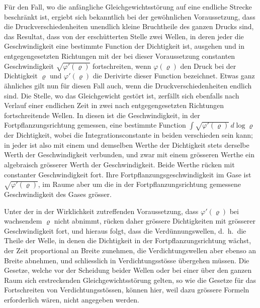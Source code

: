 \documentclass[12pt,a4paper]{article}
\begin{document}
F\"ur den Fall, wo die anf\"angliche Gleichgewichtsst\"orung auf eine endliche Strecke beschr\"ankt ist, ergiebt sich bekanntlich bei der gew\"ohnlichen Voraussetzung, dass die Druckverschiedenheiten unendlich kleine Bruchtheile des ganzen Drucks sind, das Resultat, dass von der ersch\"utterten Stelle zwei Wellen, in deren jeder die Geschwindigkeit eine bestimmte Function der Dichtigkeit ist, ausgehen und in entgegengesetzten Richtungen mit der bei dieser Voraussetzung constanten Geschwindigkeit $\sqrt{\varphi'(\varrho)}$ fortschreiten, wenn $\varphi(\varrho)$ den Druck bei der Dichtigkeit $\varrho$ und $\varphi'(\varrho)$ die Derivirte dieser Function bezeichnet. Etwas ganz \"ahnliches gilt nun f\"ur diesen Fall auch, wenn die Druckverschiedenheiten endlich sind. Die Stelle, wo das Gleichgewicht gest\"ort ist, zerf\"allt sich ebenfalls nach Verlauf einer endlichen Zeit in zwei nach entgegengesetzten Richtungen fortschreitende Wellen. In diesen ist die Geschwindigkeit, in der Fortpflanzungsrichtung gemessen, eine bestimmte Function $\int\sqrt{\varphi'(\varrho)}\,d\log\varrho$ der Dichtigkeit, wobei die Integrationsconstante in beiden verschieden sein kann; in jeder ist also mit einem und demselben Werthe der Dichtigkeit stets derselbe Werth der Geschwindigkeit verbunden, und zwar mit einem gr\"osseren Werthe ein algebraisch gr\"osserer Werth der Geschwindigkeit. Beide Werthe r\"ucken mit constanter Geschwindigkeit fort. Ihre Fortpflanzungsgeschwindigkeit im Gase ist $\sqrt{\varphi'(\varrho)}$, im Raume aber um die in der Fortpflanzungsrichtung gemessene Geschwindigkeit des Gases gr\"osser.

Unter der in der Wirklichkeit zutreffenden Voraussetzung, dass $\varphi'(\varrho)$ bei wachsendem $\varrho$ nicht abnimmt, r\"ucken daher gr\"ossere Dichtigkeiten mit gr\"osserer Geschwindigkeit fort, und hieraus folgt, dass die Verd\"unnungswellen, d.~h.~die Theile der Welle, in denen die Dichtigkeit in der Fortpflanzungsrichtung w\"achst, der Zeit proportional an Breite zunehmen, die Verdichtungswellen aber ebenso an Breite abnehmen, und schliesslich in Verdichtungsst\"osse \"ubergehen m\"ussen. Die Gesetze, welche vor der Scheidung beider Wellen oder bei einer \"uber den ganzen Raum sich erstreckenden Gleichgewichtsst\"orung gelten, so wie die Gesetze f\"ur das Fortschreiten von Verdichtungsst\"ossen, k\"onnen hier, weil dazu gr\"ossere Formeln erforderlich w\"aren, nicht angegeben werden.
\end{document}
